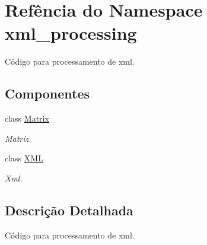 \hypertarget{namespacexml__processing}{}\section{Refência do Namespace xml\+\_\+processing}
\label{namespacexml__processing}


Código para processamento de xml.  


\subsection*{Componentes}
\begin{DoxyCompactItemize}
\item 
class \hyperlink{classxml__processing_1_1Matrix}{Matrix}
\begin{DoxyCompactList}\small\item\em Matriz. \end{DoxyCompactList}\item 
class \hyperlink{classxml__processing_1_1XML}{X\+ML}
\begin{DoxyCompactList}\small\item\em Xml. \end{DoxyCompactList}\end{DoxyCompactItemize}


\subsection{Descrição Detalhada}
Código para processamento de xml. 